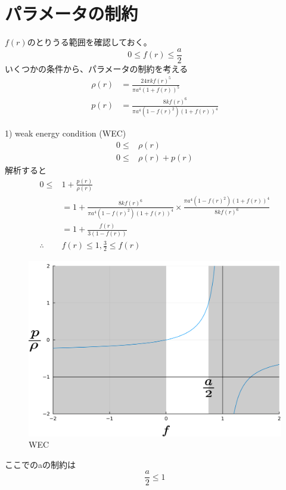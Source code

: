 \documentclass[dvipdfmx]{report} %
\begin{document}
\section{パラメータの制約}
$f(r)$のとりうる範囲を確認しておく。
\[ 0 \leq f(r) \leq \frac{a}{2} \]
いくつかの条件から、パラメータの制約を考える
\begin{equation*}
\begin{split}
	\rho(r) &= \frac{ 24 \pi k f(r)^5 }{ \pi a^4 ( 1 + f(r) )^5 }\\
	p(r) &= \frac{ 8 k f(r)^6 }{ \pi a^4 ( 1 - f(r)^2 )( 1 + f(r) )^4 }
\end{split}
\end{equation*}

1) weak energy condition (WEC)
\begin{equation*}
\begin{split}
	0 \leq & \rho(r)\\
	0 \leq & \rho(r) + p(r)
\end{split}
\end{equation*}
解析すると
\begin{equation*}
\begin{split}
	0 \leq & 1 + \frac{ p(r) }{ \rho(r) }\\
	&= 1 + \frac{ 8 k f(r)^6 }{ \pi a^4 ( 1 - f(r)^2 )( 1 + f(r) )^4 } \times \frac{ \pi a^4 ( 1 - f(r)^2 )( 1 + f(r) )^4 }{ 8 k f(r)^6 }\\
	&= 1 + \frac{ f(r) }{ 3( 1 - f(r) ) }\\
	\therefore & f(r) \leq 1 , \frac{ 3 }{ 2 } \leq f(r)
\end{split}
\end{equation*}
\begin{figure}[H]
\centering
\includegraphics[width=0.5\columnwidth]{./images/wec.png}
\caption{WEC}
\label{}
\end{figure}
ここでのaの制約は
\[ \frac{a}{2} \leq 1 \]
\end{document}
